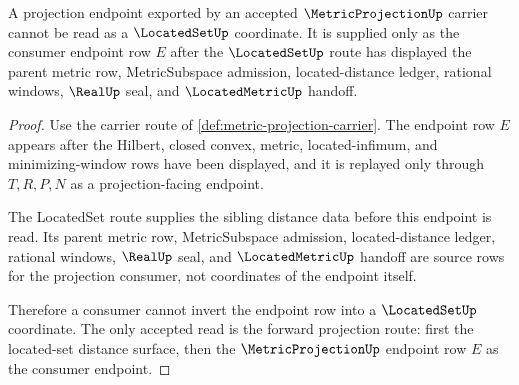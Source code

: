 \begin{theorem}\label{thm:metricprojection-locatedset-endpoint-separation}
A projection endpoint exported by an accepted $\MetricProjectionUp$ carrier cannot be read as a $\LocatedSetUp$ coordinate. It is supplied only as the consumer endpoint row $E$ after the $\LocatedSetUp$ route has displayed the parent metric row, MetricSubspace admission, located-distance ledger, rational windows, $\RealUp$ seal, and $\LocatedMetricUp$ handoff.
\end{theorem}
\begin{proof}
Use the carrier route of \autoref{def:metric-projection-carrier}. The endpoint row $E$ appears after the Hilbert, closed convex, metric, located-infimum, and minimizing-window rows have been displayed, and it is replayed only through $T,R,P,N$ as a projection-facing endpoint.

The LocatedSet route supplies the sibling distance data before this endpoint is read. Its parent metric row, MetricSubspace admission, located-distance ledger, rational windows, $\RealUp$ seal, and $\LocatedMetricUp$ handoff are source rows for the projection consumer, not coordinates of the endpoint itself.

Therefore a consumer cannot invert the endpoint row into a $\LocatedSetUp$ coordinate. The only accepted read is the forward projection route: first the located-set distance surface, then the $\MetricProjectionUp$ endpoint row $E$ as the consumer endpoint.
\end{proof}

